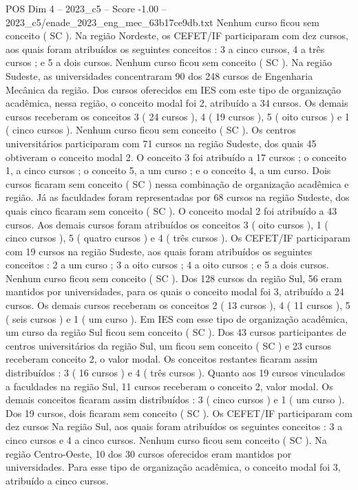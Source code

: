 \begin{textsample}{POS Dim 4 – 2023\_c5 – Score -1.00 – 2023\_c5/enade\_2023\_eng\_mec\_63b17ce9db.txt}
Nenhum curso ficou sem conceito ( SC ).
Na região Nordeste, os CEFET/IF participaram com dez cursos, aos quais foram atribuídos os seguintes conceitos : 3 a cinco cursos, 4 a três cursos ; e 5 a dois cursos.
Nenhum curso ficou sem conceito ( SC ).
Na região Sudeste, as universidades concentraram 90 dos 248 cursos de Engenharia Mecânica da região.
Dos cursos oferecidos em IES com este tipo de organização acadêmica, nessa região, o conceito modal foi 2, atribuído a 34 cursos.
Os demais cursos receberam os conceitos 3 ( 24 cursos ), 4 ( 19 cursos ), 5 ( oito cursos ) e 1 ( cinco cursos ).
Nenhum curso ficou sem conceito ( SC ).
Os centros universitários participaram com 71 cursos na região Sudeste, dos quais 45 obtiveram o conceito modal 2.
O conceito 3 foi atribuído a 17 cursos ; o conceito 1, a cinco cursos ; o conceito 5, a um curso ; e o conceito 4, a um curso.
Dois cursos ficaram sem conceito ( SC ) nessa combinação de organização acadêmica e região.
Já as faculdades foram representadas por 68 cursos na região Sudeste, dos quais cinco ficaram sem conceito ( SC ).
O conceito modal 2 foi atribuído a 43 cursos.
Aos demais cursos foram atribuídos os conceitos 3 ( oito cursos ), 1 ( cinco cursos ), 5 ( quatro cursos ) e 4 ( três cursos ).
Os CEFET/IF participaram com 19 cursos na região Sudeste, aos quais foram atribuídos os seguintes conceitos : 2 a um curso ; 3 a oito cursos ; 4 a oito cursos ; e 5 a dois cursos.
Nenhum curso ficou sem conceito ( SC ).
Dos 128 cursos da região Sul, 56 eram mantidos por universidades, para os quais o conceito modal foi 3, atribuído a 24 cursos.
Os demais cursos receberam os conceitos 2 ( 13 cursos ), 4 ( 11 cursos ), 5 ( seis cursos ) e 1 ( um curso ).
Em IES com esse tipo de organização acadêmica, um curso da região Sul ficou sem conceito ( SC ).
Dos 43 cursos participantes de centros universitários da região Sul, um ficou sem conceito ( SC ) e 23 cursos receberam conceito 2, o valor modal.
Os conceitos restantes ficaram assim distribuídos : 3 ( 16 cursos ) e 4 ( três cursos ).
Quanto aos 19 cursos vinculados a faculdades na região Sul, 11 cursos receberam o conceito 2, valor modal.
Os demais conceitos ficaram assim distribuídos : 3 ( cinco cursos ) e 1 ( um curso ).
Dos 19 cursos, dois ficaram sem conceito ( SC ).
Os CEFET/IF participaram com dez cursos Na região Sul, aos quais foram atribuídos os seguintes conceitos : 3 a cinco cursos e 4 a cinco cursos.
Nenhum curso ficou sem conceito ( SC ).
Na região Centro-Oeste, 10 dos 30 cursos oferecidos eram mantidos por universidades.
Para esse tipo de organização acadêmica, o conceito modal foi 3, atribuído a cinco cursos.

\end{textsample}
